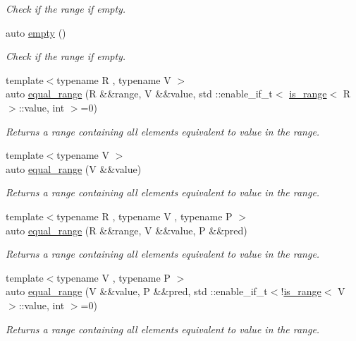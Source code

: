 \begin{DoxyCompactItemize}
\begin{DoxyCompactList}\small\item\em Check if the range if empty. \end{DoxyCompactList}\item 
auto \mbox{\hyperlink{namespacerah_a6ceb90c934b1c4927ab4e08b985ef6c5}{empty}} ()
\begin{DoxyCompactList}\small\item\em Check if the range if empty. \end{DoxyCompactList}\item 
{\footnotesize template$<$typename R , typename V $>$ }\\auto \mbox{\hyperlink{namespacerah_a984a8f5d104b54913aefe80077c2026f}{equal\+\_\+range}} (R \&\&range, V \&\&value, std \+::enable\+\_\+if\+\_\+t$<$ \mbox{\hyperlink{structrah_1_1is__range}{is\+\_\+range}}$<$ R $>$\+::value, int $>$=0)
\begin{DoxyCompactList}\small\item\em Returns a range containing all elements equivalent to value in the range. \end{DoxyCompactList}\item 
{\footnotesize template$<$typename V $>$ }\\auto \mbox{\hyperlink{namespacerah_afa191bbe5b7dbb9b2e7a21a87dbb9a8a}{equal\+\_\+range}} (V \&\&value)
\begin{DoxyCompactList}\small\item\em Returns a range containing all elements equivalent to value in the range. \end{DoxyCompactList}\item 
{\footnotesize template$<$typename R , typename V , typename P $>$ }\\auto \mbox{\hyperlink{namespacerah_a8e598fa8efba31247802621369eb7c55}{equal\+\_\+range}} (R \&\&range, V \&\&value, P \&\&pred)
\begin{DoxyCompactList}\small\item\em Returns a range containing all elements equivalent to value in the range. \end{DoxyCompactList}\item 
{\footnotesize template$<$typename V , typename P $>$ }\\auto \mbox{\hyperlink{namespacerah_a4669ef1ede981eaa73e76449c0fa138b}{equal\+\_\+range}} (V \&\&value, P \&\&pred, std \+::enable\+\_\+if\+\_\+t$<$!\mbox{\hyperlink{structrah_1_1is__range}{is\+\_\+range}}$<$ V $>$\+::value, int $>$=0)
\begin{DoxyCompactList}\small\item\em Returns a range containing all elements equivalent to value in the range. \end{DoxyCompactList}\item 

\end{DoxyCompactItemize}
